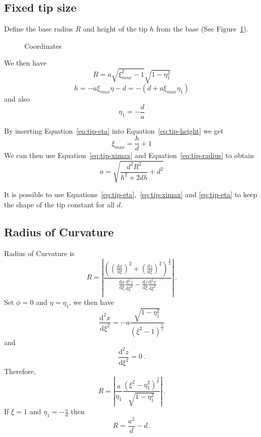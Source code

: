 \documentclass[a4paper,10pt]{article}
\newcommand{\ud}{\mathrm{d}}
\begin{document}
\subsection{Fixed tip size}
  Define the base radius \(R\) and height of the tip \(h\) from the base (See Figure~\ref{fig:coords_Rh}).
  \begin{figure}
    \centering
    
    \caption{Coordinates}
    \label{fig:coords_Rh}
  \end{figure}
  We then have
  \begin{equation}\label{eq:tip-radius}
    R = a \sqrt{\xi_{max}^2-1}\sqrt{1-\eta_1^2}
  \end{equation}
  \begin{equation}\label{eq:tip-height}
    h = -a\xi_{max}\eta - d = -\left( d + a\xi_{max}\eta_1 \right)
  \end{equation}
  and also
  \begin{equation}\label{eq:tip-eta}
    \eta_1 = -\frac{d}{a}
  \end{equation}

  By inserting Equation~\eqref{eq:tip-eta} into Equation~\eqref{eq:tip-height} we get
  \begin{equation}\label{eq:tip-ximax}
    \xi_{max} = \frac{h}{d} + 1
  \end{equation}
  We can then use Equation~\eqref{eq:tip-ximax} and Equation~\eqref{eq:tip-radius} to obtain
  \begin{equation}\label{eq:tip-a}
    a = \sqrt{\frac{d^2R^2}{h^2 + 2dh} + d^2}
  \end{equation}

  It is possible to use Equations~\eqref{eq:tip-eta},~\eqref{eq:tip-ximax} and \eqref{eq:tip-eta} to keep
  the shape of the tip constant for all \(d\).
%
\subsection{Radius of Curvature}
  Radius of Curvature is
  \begin{equation}
    R = \left| \frac{\left( \left(\frac{\ud x}{\ud \xi}\right)^2 + \left(\frac{\ud z}{\ud \xi}\right)^2 \right)^{\frac{3}{2}}}{\frac{\ud x}{\ud \xi} \frac{\ud^2 z}{\ud \xi^2} - \frac{\ud z}{\ud \xi} \frac{\ud^2 x}{\ud \xi^2}} \right| \, .
  \end{equation}
  Set \(\phi = 0\) and \(\eta = \eta_1\), we then have
  \begin{equation}
    \frac{\ud^2 x}{\ud \xi^2} = - a \frac{\sqrt{1-\eta_1^2}}{(\xi^2-1)^{\frac{3}{2}}}
  \end{equation}
  and
  \begin{equation}
    \frac{\ud^2 z}{\ud \xi^2} = 0\, .
  \end{equation}
  Therefore,
  \begin{equation}
    R = \left| \frac{a}{\eta_1} \frac{(\xi^2 - \eta_1^2)^{\frac{3}{2}}}{\sqrt{1-\eta_1^2}} \right| \, .
  \end{equation}
  If \(\xi = 1\) and \(\eta_1 = -\frac{a}{d}\) then
  \begin{equation}
    R = \frac{a^2}{d} - d\, .
  \end{equation}
%
\end{document}
